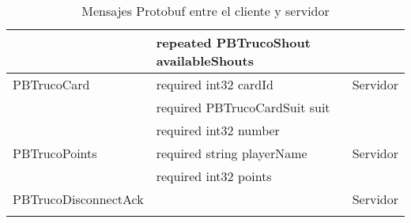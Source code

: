 \begin{longtable}{|p{}|p{}|p{}|}
                    & repeated PBTrucoShout availableShouts & \\
    \hline
    PBTrucoCard & required int32 cardId & Servidor \\
                & required PBTrucoCardSuit suit & \\
                & required int32 number & \\
    \hline
    PBTrucoPoints & required string playerName & Servidor \\
                    & required int32 points & \\
    \hline
    PBTrucoDisconnectAck &  & Servidor \\
    \hline
\caption{Mensajes Protobuf entre el cliente y servidor} \\
\end{longtable}
